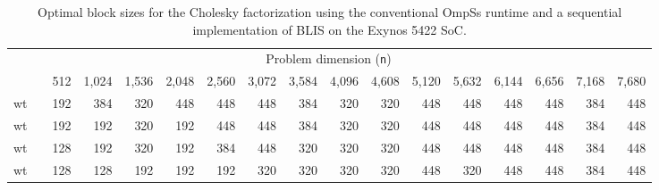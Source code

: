 \newcommand{\ra}[1]{\renewcommand{\arraystretch}{#1}}
\newcommand{\ca}[1]{\renewcommand{\tabcolsep}{#1}}

\ra{1.2}
\ca{2pt}

\begin{table}
	\centering
	\caption{Optimal block sizes for the Cholesky factorization using the conventional 
                 OmpSs runtime and a sequential implementation of BLIS on the Exynos 5422 SoC.}
	\label{tab:optimal_bs_sym}
{\scriptsize
\begin{tabular}{crrrrrrrrrrrrrrrr} 
\toprule
  & \phantom{a} & \multicolumn{14}{c}{Problem dimension ({\tt n})} \\ 
\cmidrule{3-17} 
  & \phantom{a} &     512 & 1,024 & 1,536 & 2,048 & 2,560 & 3,072 & 3,584 & 4,096 & 4,608 & 5,120 & 5,632 & 6,144 & 6,656 & 7,168 & 7,680 \\ \hline

{\sc 1 wt} & \phantom{a} &     192 & 384  & 320  & 448  & 448  & 448  & 384  & 320 & 320 & 448 & 448 & 448 & 448 & 384 & 448 \\ \hline
{\sc 2 wt} & \phantom{a} &     192 & 192  & 320  & 192  & 448  & 448  & 384  & 320 & 320 & 448 & 448 & 448 & 448 & 384 & 448 \\ \hline
{\sc 3 wt} & \phantom{a} &     128 & 192  & 320  & 192  & 384  & 448  & 320  & 320 & 320 & 448 & 448 & 448 & 448 & 384 & 448 \\ \hline
{\sc 4 wt} & \phantom{a} &     128 & 128  & 192  & 192  & 192  & 320  & 320  & 320 & 320 & 448 & 320 & 448 & 448 & 384 & 448 \\ \bottomrule
\end{tabular}
}
\end{table}


